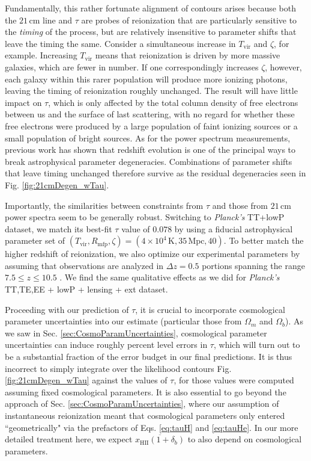 \documentclass[twocolumn,aps,prd,nofootinbib,showpacs]{revtex4-1}
\begin{document}
Fundamentally, this rather fortunate alignment of contours arises because both the $21\,\textrm{cm}$ line and $\tau$ are probes of reionization that are particularly sensitive to the \emph{timing} of the process, but are relatively insensitive to parameter shifts that leave the timing the same. Consider a simultaneous increase in $T_\textrm{vir}$ and $\zeta$, for example. Increasing $T_\textrm{vir}$ means that reionization is driven by more massive galaxies, which are fewer in number. If one correspondingly increases $\zeta$, however, each galaxy within this rarer population will produce more ionizing photons, leaving the timing of reionization roughly unchanged. The result will have little impact on $\tau$, which is only affected by the total column density of free electrons between us and the surface of last scattering, with no regard for whether these free electrons were produced by a large population of faint ionizing sources or a small population of bright sources. As for the power spectrum measurements, previous work \cite{pober_et_al2014} has shown that redshift evolution is one of the principal ways to break astrophysical parameter degeneracies. Combinations of parameter shifts that leave timing unchanged therefore survive as the residual degeneracies seen in Fig. \ref{fig:21cmDegen_wTau}.

Importantly, the similarities between constraints from $\tau$ and those from $21\,\textrm{cm}$  power spectra seem to be generally robust. Switching to \emph{Planck's} TT+lowP dataset, we match its best-fit $\tau$ value of $0.078$ by using a fiducial astrophysical parameter set of $(T_\textrm{vir}, R_\textrm{mfp}, \zeta) = (4 \times 10^4\,\textrm{K}, 35\,\textrm{Mpc}, 40)$. To better match the higher redshift of reionization, we also optimize our experimental parameters by assuming that observations are analyzed in $\Delta z = 0.5$ portions spanning the range $7.5 \le z \le 10.5$ \cite{Liu_in_prep}. We find the same qualitative effects as we did for \emph{Planck's} TT,TE,EE + lowP + lensing + ext dataset.

Proceeding with our prediction of $\tau$, it is crucial to incorporate cosmological parameter uncertainties into our estimate (particular those from $\Omega_m$ and $\Omega_b$). As we saw in Sec. \ref{sec:CosmoParamUncertainties}, cosmological parameter uncertainties can induce roughly percent level errors in $\tau$, which will turn out to be a substantial fraction of the error budget in our final predictions. It is thus incorrect to simply integrate over the likelihood contours Fig. \ref{fig:21cmDegen_wTau} against the values of $\tau$, for those values were computed assuming fixed cosmological parameters. It is also essential to go beyond the approach of Sec. \ref{sec:CosmoParamUncertainties}, where our assumption of instantaneous reionization meant that cosmological parameters only entered ``geometrically" via the prefactors of Eqs. \eqref{eq:tauH} and \eqref{eq:tauHe}. In our more detailed treatment here, we expect $\overline{x_\textrm{HII} (1+\delta_b)}$ to also depend on cosmological parameters.
\end{document}
